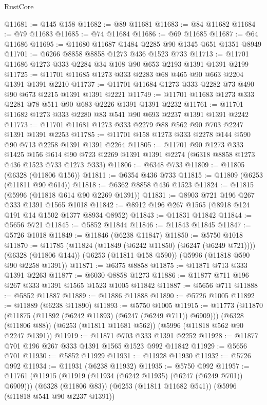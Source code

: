 \begin{lexlean}{RustCore}
\begin{coremodule}
@11681 := @145 @158
@11682 := @89 @11681
@11683 := @84 @11682
@11684 := @79 @11683
@11685 := @74 @11684
@11686 := @69 @11685
@11687 := @64 @11686
@11695 := @11680 @11687 @1484 @2285 @90 @1345 @651 @1351 @8949
@11701 := @6266 @8858 @8858 @1273 @436 @1523 @733
@11713 := @11701 @11686 @1273 @333 @2284 @34 @108 @90 @653 @2193 @1391 @1391 @2199
@11725 := @11701 @11685 @1273 @333 @2283 @68 @465 @90 @663 @2204 @1391 @1391 @2210
@11737 := @11701 @11684 @1273 @333 @2282 @73 @490 @90 @673 @2215 @1391 @1391 @2221
@11749 := @11701 @11683 @1273 @333 @2281 @78 @511 @90 @683 @2226 @1391 @1391 @2232
@11761 := @11701 @11682 @1273 @333 @2280 @83 @541 @90 @693 @2237 @1391 @1391 @2242
@11773 := @11701 @11681 @1273 @333 @2279 @88 @562 @90 @703 @2247 @1391 @1391 @2253
@11785 := @11701 @158 @1273 @333 @2278 @144 @590 @90 @713 @2258 @1391 @1391 @2264
@11805 := @11701
    @90
    @1273
    @333
    @1425
    @156
    @614
    @90
    @723
    @2269
    @1391
    @1391
    @2274
    (@6318 @8858 @1273 @436 @1523 @733 @1273 @333)
@11806 := @6348 @733
@11809 := @11805 (@6328 (@11806 @156))
@11811 := @6354 @436 @733
@11815 := @11809 (@6253 (@11811 @90 @614))
@11818 := @6362 @8858 @436 @1523
@11824 := @11815 (@5996 (@11818 @614 @90 @2269 @1391))
@11831 := @8903 @721 @196 @267 @333 @1391 @1565 @1018
@11842 := @8912 @196 @267 @1565 (@8918 @124 @191 @14 @1502 @1377 @8934 @8952)
@11843 := @11831 @11842
@11844 := @5656 @721
@11845 := @5852 @11844
@11846 := @11843 @11845
@11847 := @5726 @1018
@11849 := @11846 (@6238 @11847)
@11850 := @5750 @1018
@11870 := @11785
    (@11824 (@11849 (@6242 @11850) (@6247 (@6249 @721))))
    (@6328 (@11806 @144))
    (@6253 (@11811 @158 @590))
    (@5996 (@11818 @590 @90 @2258 @1391))
@11871 := @6375 @8858
@11875 := @11871 @713 @333 @1391 @2263
@11877 := @6030 @8858 @1273
@11886 := @11877 @711 @196 @267 @333 @1391 @1565 @1523 @1005 @11842
@11887 := @5656 @711
@11888 := @5852 @11887
@11889 := @11886 @11888
@11890 := @5726 @1005
@11892 := @11889 (@6238 @11890)
@11893 := @5750 @1005
@11915 := @11773
    (@11870 (@11875 (@11892 (@6242 @11893) (@6247 (@6249 @711)) @6909)))
    (@6328 (@11806 @88))
    (@6253 (@11811 @11681 @562))
    (@5996 (@11818 @562 @90 @2247 @1391))
@11919 := @11871 @703 @333 @1391 @2252
@11928 := @11877 @701 @196 @267 @333 @1391 @1565 @1523 @992 @11842
@11929 := @5656 @701
@11930 := @5852 @11929
@11931 := @11928 @11930
@11932 := @5726 @992
@11934 := @11931 (@6238 @11932)
@11935 := @5750 @992
@11957 := @11761
    (@11915 (@11919 (@11934 (@6242 @11935) (@6247 (@6249 @701)) @6909)))
    (@6328 (@11806 @83))
    (@6253 (@11811 @11682 @541))
    (@5996 (@11818 @541 @90 @2237 @1391))

\end{coremodule}
\end{lexlean}
